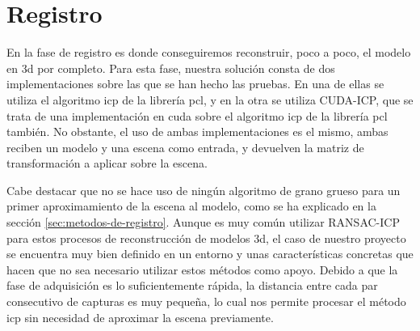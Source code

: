 
\section{Registro}

En la fase de registro es donde conseguiremos reconstruir, poco a poco, el modelo en \gls{3d} por completo.
Para esta fase, nuestra solución consta de dos implementaciones sobre las que se han hecho las pruebas.
En una de ellas se utiliza el algoritmo \gls{icp} de la librería \gls{pcl}, y en la otra se utiliza CUDA-ICP, que se trata de una implementación en \gls{cuda} sobre el algoritmo \gls{icp} de la librería \gls{pcl} también.
No obstante, el uso de ambas implementaciones es el mismo, ambas reciben un modelo y una escena como entrada, y devuelven la matriz de transformación a aplicar sobre la escena.

Cabe destacar que no se hace uso de ningún algoritmo de grano grueso para un primer aproximamiento de la escena al modelo, como se ha explicado en la sección \ref{sec:metodos-de-registro}.
Aunque es muy común utilizar RANSAC-ICP para estos procesos de reconstrucción de modelos \gls{3d}, el caso de nuestro proyecto se encuentra muy bien definido en un entorno y unas características concretas que hacen que no sea necesario utilizar estos métodos como apoyo.
Debido a que la fase de adquisición es lo suficientemente rápida, la distancia entre cada par consecutivo de capturas es muy pequeña, lo cual nos permite procesar el método \gls{icp} sin necesidad de aproximar la escena previamente.

